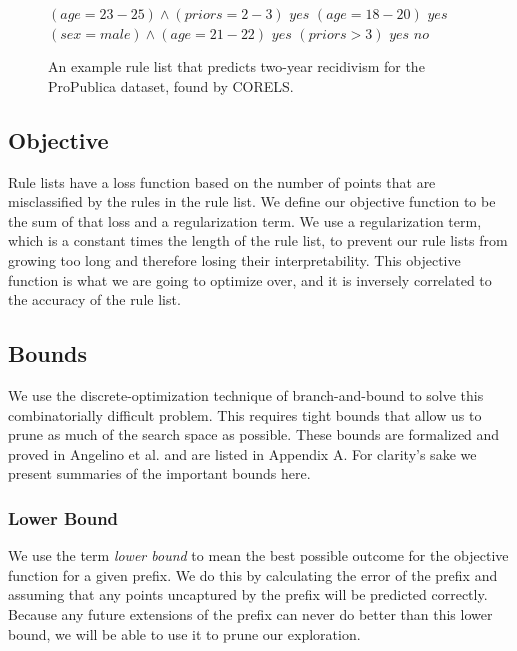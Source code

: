 \begin{figure}[t!]
\begin{algorithmic}
\normalsize
\State \bif $(age=23-25) \wedge (priors=2-3)$ \bthen $yes$
\State \belif $(age=18-20)$ \bthen $yes$
\State \belif $(sex=male) \wedge (age=21-22)$ \bthen $yes$
\State \belif $(priors>3)$ \bthen $yes$
\State \belse $no$
\end{algorithmic}
\caption{An example rule list that predicts two-year recidivism for the ProPublica dataset, found by CORELS.}
\label{fig:rule-list}
\end{figure}

\subsection{Objective}
Rule lists have a loss function based on the number of points that are misclassified by the rules in the rule list.
We define our objective function to be the sum of that loss and a regularization term.
We use a regularization term, which is a constant times the length of the rule list, to prevent our rule lists from growing too long and therefore losing their interpretability.
This objective function is what we are going to optimize over, and it is inversely correlated to the accuracy of the rule list. 

\subsection{Bounds}
We use the discrete-optimization technique of branch-and-bound to solve this combinatorially difficult problem.
This requires tight bounds that allow us to prune as much of the search space as possible.
These bounds are formalized and proved in Angelino et al. \cite{AngelinoLaAlSeRu17} and are listed in Appendix A.
For clarity's sake we present summaries of the important bounds here.

\subsubsection{Lower Bound}
We use the term \textit{lower bound} to mean the best possible outcome for the objective function for a given prefix.
We do this by calculating the error of the prefix and assuming that any points uncaptured by the prefix will be predicted correctly.
Because any future extensions of the prefix can never do better than this lower bound, we will be able to use it to prune our exploration.

